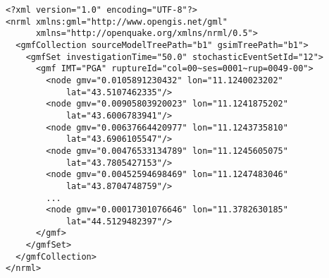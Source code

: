 \begin{Verbatim}[frame=single, commandchars=\\\{\}, fontsize=\small]
<?xml version="1.0" encoding="UTF-8"?>
<nrml xmlns:gml="http://www.opengis.net/gml"
      xmlns="http://openquake.org/xmlns/nrml/0.5">
  <gmfCollection sourceModelTreePath="b1" gsimTreePath="b1">
    <gmfSet investigationTime="50.0" stochasticEventSetId="12">
      <gmf IMT="PGA" ruptureId="col=00~ses=0001~rup=0049-00">
        <node gmv="0.0105891230432" lon="11.1240023202"
            lat="43.5107462335"/>
        <node gmv="0.00905803920023" lon="11.1241875202"
            lat="43.6006783941"/>
        <node gmv="0.00637664420977" lon="11.1243735810"
            lat="43.6906105547"/>
        <node gmv="0.00476533134789" lon="11.1245605075"
            lat="43.7805427153"/>
        <node gmv="0.00452594698469" lon="11.1247483046"
            lat="43.8704748759"/>
        ...
        <node gmv="0.00017301076646" lon="11.3782630185"
            lat="44.5129482397"/>
      </gmf>
    </gmfSet>
  </gmfCollection>
</nrml>
\end{Verbatim}
